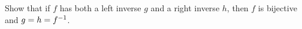 \documentclass[main.tex]{subfiles}
\begin{document}
\subproblem{}\label{s2p5e}

Show that if \(f\) has both a left inverse \(g\) and a right inverse \(h\), then
\(f\) is bijective and \(g = h = {f}^{-1}\).

\todo{}
\end{document}
